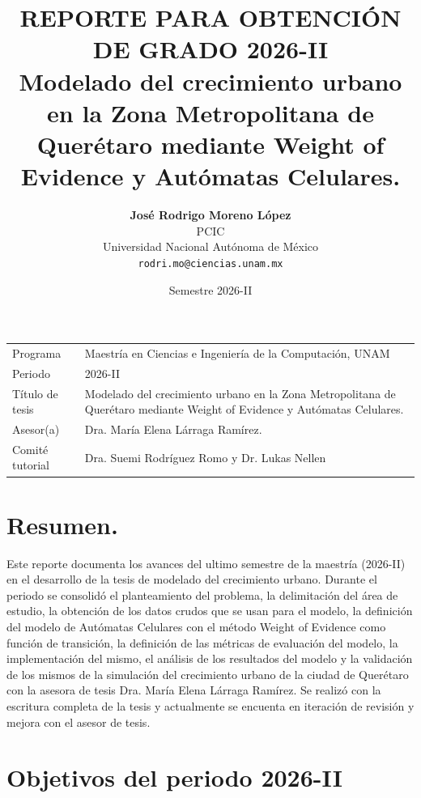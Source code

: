 \documentclass[12pt,letterpaper]{article}
\title{%
  \textbf{\color{UAQBlue}REPORTE PARA OBTENCIÓN DE GRADO 2026-II}\\[0.6cm]
  \Large Modelado del crecimiento urbano en la Zona Metropolitana de Querétaro mediante Weight of Evidence y Autómatas Celulares.
}
\author{%
  \textbf{José Rodrigo Moreno López}\\
  PCIC\\
  Universidad Nacional Autónoma de México\\
  \texttt{rodri.mo@ciencias.unam.mx}
}
\date{Semestre 2026-II}
\begin{document}
\maketitle


\begin{table}[H]
\centering
\label{tab:datos_generales}
\begin{tabular}{@{}p{4.2cm}p{10.3cm}@{}}
\toprule
\midrule
Programa & Maestría en Ciencias e Ingeniería de la Computación, UNAM \\
Periodo & 2026-II \\
Título de tesis & Modelado del crecimiento urbano en la Zona Metropolitana de Querétaro mediante Weight of Evidence y Autómatas Celulares. \\
Asesor(a) & Dra. María Elena Lárraga Ramírez. \\
Comité tutorial & Dra. Suemi Rodríguez Romo y Dr. Lukas Nellen \\
\bottomrule
\end{tabular}
\end{table}

\newpage
\section{Resumen.}

Este reporte documenta los avances del ultimo semestre de la maestría (2026-II) en el desarrollo de la tesis de modelado del crecimiento urbano. Durante el periodo se consolidó el planteamiento del problema, la delimitación del área de estudio, la obtención de los datos crudos que se usan para el modelo, la definición del modelo de Autómatas Celulares con el método Weight of Evidence como función de transición, la definición de las métricas de evaluación del modelo, la implementación del mismo, el análisis de los resultados del modelo y la validación de los mismos de la simulación del crecimiento urbano de la ciudad de Querétaro con la asesora de tesis Dra. María Elena Lárraga Ramírez. Se realizó con la escritura completa de la tesis y actualmente se encuenta en iteración de revisión y mejora con el asesor de tesis. 

\section{Objetivos del periodo 2026-II}
\end{document}
